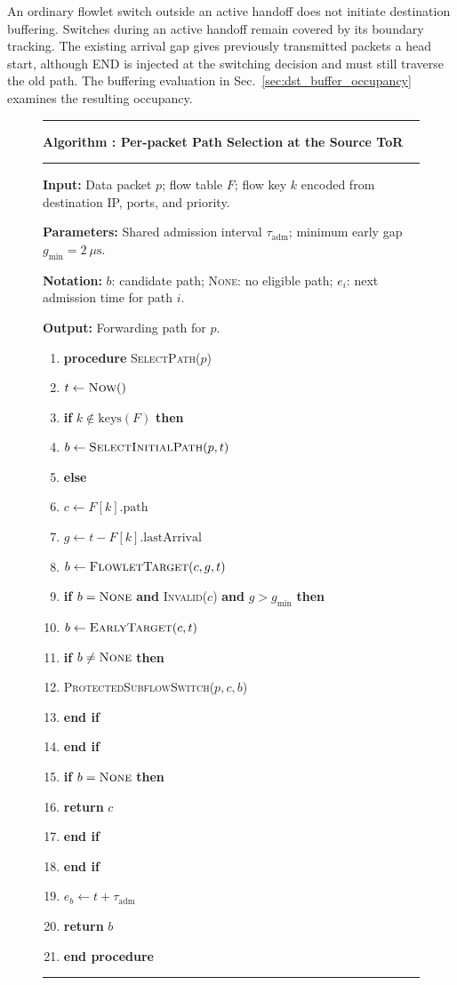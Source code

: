 \documentclass[10pt,journal,compsoc]{IEEEtran}
\newcounter{algorithm}
\begin{document}
An ordinary flowlet switch outside an active handoff does not initiate destination buffering. Switches during an active handoff remain covered by its boundary tracking. The existing arrival gap gives previously transmitted packets a head start, although END is injected at the switching decision and must still traverse the old path. The buffering evaluation in Sec.~\ref{sec:dst_buffer_occupancy} examines the resulting occupancy.

\begin{figure}[t]
    \centering
    \begin{minipage}{\columnwidth}
    \small
    \label{alg:per_packet_selection}
    \hrule\vspace{4pt}
    \textbf{Algorithm \thealgorithm: Per-packet Path Selection at the Source ToR}
    \par\vspace{3pt}\hrule\vspace{4pt}
    \textbf{Input:} Data packet $p$; flow table $F$; flow key $k$
    encoded from destination IP, ports, and priority.\par
    \textbf{Parameters:} Shared admission interval $\tau_{\mathrm{adm}}$;
    minimum early gap $g_{\min}=2~\mu\mathrm{s}$.\par
    \textbf{Notation:} $b$: candidate path; \textsc{None}: no eligible path;
    $e_i$: next admission time for path $i$.\par
    \textbf{Output:} Forwarding path for $p$.\par
    \newcommand{\algline}[2]{\item\hspace*{#1em}#2}
    \begin{enumerate}[label=\arabic*:,leftmargin=1.8em,labelsep=0.5em,itemsep=0pt,parsep=0pt,topsep=4pt]
        \algline{0}{\textbf{procedure} \textsc{SelectPath}($p$)}
        \algline{1}{$t\gets\textsc{Now}()$}
        \algline{1}{\textbf{if} $k\notin\mathrm{keys}(F)$ \textbf{then}}
        \algline{2}{$b\gets\textsc{SelectInitialPath}(p,t)$}
        \algline{1}{\textbf{else}}
        \algline{2}{$c\gets F[k].\mathrm{path}$}
        \algline{2}{$g\gets t-F[k].\mathrm{lastArrival}$}
        \algline{2}{$b\gets\textsc{FlowletTarget}(c,g,t)$}
        \algline{2}{\textbf{if} $b=\textsc{None}$ \textbf{and} \textsc{Invalid}($c$) \textbf{and} $g>g_{\min}$ \textbf{then}}
        \algline{3}{$b\gets\textsc{EarlyTarget}(c,t)$}
        \algline{3}{\textbf{if} $b\neq\textsc{None}$ \textbf{then}}
        \algline{4}{\textsc{ProtectedSubflowSwitch}($p,c,b$)}
        \algline{3}{\textbf{end if}}
        \algline{2}{\textbf{end if}}
        \algline{2}{\textbf{if} $b=\textsc{None}$ \textbf{then}}
        \algline{3}{\textbf{return} $c$}
        \algline{2}{\textbf{end if}}
        \algline{1}{\textbf{end if}}
        \algline{1}{$e_b\gets t+\tau_{\mathrm{adm}}$}
        \algline{1}{\textbf{return} $b$}
        \algline{0}{\textbf{end procedure}}
    \end{enumerate}
    \vspace{2pt}\hrule
    \end{minipage}
\end{figure}
\end{document}
